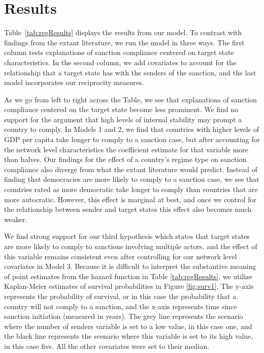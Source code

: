 \section*{Results}
\label{Results} 


Table~\ref{tab:regResults} displays the results from our model. To contrast with findings from the extant literature, we run the model in three ways. The first column tests explanations of sanction compliance centered on target state characteristics. In the second column, we add covariates to account for the relationship that a target state has with the senders of the sanction, and the last model incorporates our reciprocity measures. 

As we go from left to right across the Table, we see that explanations of sanction compliance centered on the target state become less prominent. We find no support for the argument that high levels of internal stability may prompt a country to comply. In Models 1 and 2, we find that countries with higher levels of GDP per capita take longer to comply to a sanction case, but after accounting for the network level characteristics the coefficient estimate for that variable more than halves. Our findings for the effect of a country's regime type on sanction compliance also diverge from what the extant literature would predict. Instead of finding that democracies are more likely to comply to a sanction case, we see that countries rated as more democratic take longer to comply than countries that are more autocratic. However, this effect is marginal at best, and once we control for the relationship between sender and target states this effect also becomes much weaker. 



We find strong support for our third hypothesis which states that target states are more likely to comply to sanctions involving multiple actors, and the effect of this variable remains consistent even after controlling for our network level covariates in Model 3. Because it is difficult to interpret the substantive meaning of point estimates from the hazard function in Table \ref{tab:regResults}, we utilize Kaplan-Meier estimates of survival probabilities in Figure \ref{fig:surv1}. The y-axis represents the probability of survival, or in this case the probability that a country will not comply to a sanction, and the x-axis represents time since sanction initiation (measured in years). The grey line represents the scenario where the number of senders variable is set to a low value, in this case one, and the black line represents the scenario where this variable is set to its high value, in this case five. All the other covariates were set to their median. 

